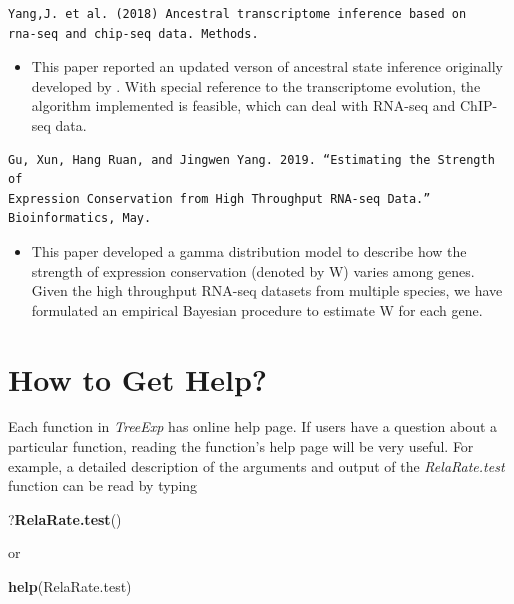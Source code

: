 \documentclass[]{book}
\newenvironment{Shaded}{\begin{snugshade}}{\end{snugshade}}
\newcommand{\KeywordTok}[1]{\textcolor[rgb]{0.13,0.29,0.53}{\textbf{#1}}}
\newcommand{\NormalTok}[1]{#1}
\providecommand{\tightlist}{%
  \setlength{\itemsep}{0pt}\setlength{\parskip}{0pt}}
\begin{document}
\begin{verbatim}
Yang,J. et al. (2018) Ancestral transcriptome inference based on
rna-seq and chip-seq data. Methods.
\end{verbatim}

\begin{itemize}
\tightlist
\item
  This paper\citep{YANG2018} reported an updated verson of ancestral state inference originally developed by \citep{gu2004}. With special reference to the transcriptome evolution, the algorithm implemented is feasible, which can deal with RNA-seq and ChIP-seq data.
\end{itemize}

\begin{verbatim}
Gu, Xun, Hang Ruan, and Jingwen Yang. 2019. “Estimating the Strength of 
Expression Conservation from High Throughput RNA-seq Data.” Bioinformatics, May.
\end{verbatim}

\begin{itemize}
\tightlist
\item
  This paper \citep{10.1093/bioinformatics/btz405} developed a gamma distribution model to describe how the strength of expression conservation (denoted by W) varies among genes. Given the high throughput RNA-seq datasets from multiple species, we have formulated an empirical Bayesian procedure to estimate W for each gene.
\end{itemize}

\newpage

\hypertarget{how-to-get-help}{%
\section{How to Get Help?}\label{how-to-get-help}}

Each function in \emph{TreeExp} has online help page. If users have a question about a particular function, reading the function's help page will be very useful. For example, a detailed description of the arguments and output of the \emph{RelaRate.test} function can be read by typing

\begin{Shaded}
\begin{Highlighting}[]
\NormalTok{?}\KeywordTok{RelaRate.test}\NormalTok{()}
\end{Highlighting}
\end{Shaded}

or

\begin{Shaded}
\begin{Highlighting}[]
\KeywordTok{help}\NormalTok{(RelaRate.test)}
\end{Highlighting}
\end{Shaded}
\end{document}

